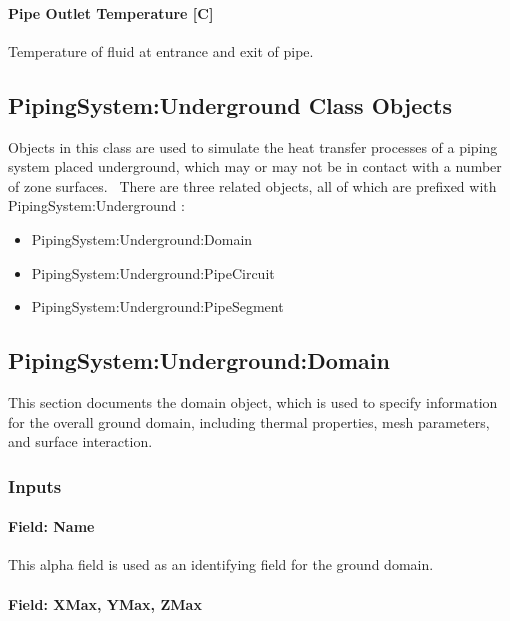 \paragraph{Pipe Outlet Temperature {[}C{]}}\label{pipe-outlet-temperature-c-2}

Temperature of fluid at entrance and exit of pipe.

\subsection{PipingSystem:Underground Class Objects}\label{pipingsystemunderground-class-objects}

Objects in this class are used to simulate the heat transfer processes of a piping system placed underground, which may or may not be in contact with a number of zone surfaces.~ There are three related objects, all of which are prefixed with PipingSystem:Underground :

\begin{itemize}
\item
  PipingSystem:Underground:Domain
\item
  PipingSystem:Underground:PipeCircuit
\item
  PipingSystem:Underground:PipeSegment
\end{itemize}

\subsection{PipingSystem:Underground:Domain}\label{pipingsystemundergrounddomain}

This section documents the domain object, which is used to specify information for the overall ground domain, including thermal properties, mesh parameters, and surface interaction.

\subsubsection{Inputs}\label{inputs-9-011}

\paragraph{Field: Name}\label{field-name-9-010}

This alpha field is used as an identifying field for the ground domain.

\paragraph{Field: XMax, YMax, ZMax}\label{field-xmax-ymax-zmax}

